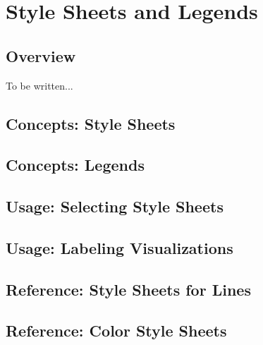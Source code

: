 %
%
%


\section{Style Sheets and Legends}
\label{section-dv-style-sheets}

\subsection{Overview}

To be written...

\subsection{Concepts: Style Sheets}

\subsection{Concepts: Legends}
\label{section-dv-labels-in}

\subsection{Usage: Selecting Style Sheets}

\subsection{Usage: Labeling Visualizations}

\subsection{Reference: Style Sheets for Lines}

\subsection{Reference: Color Style Sheets}

